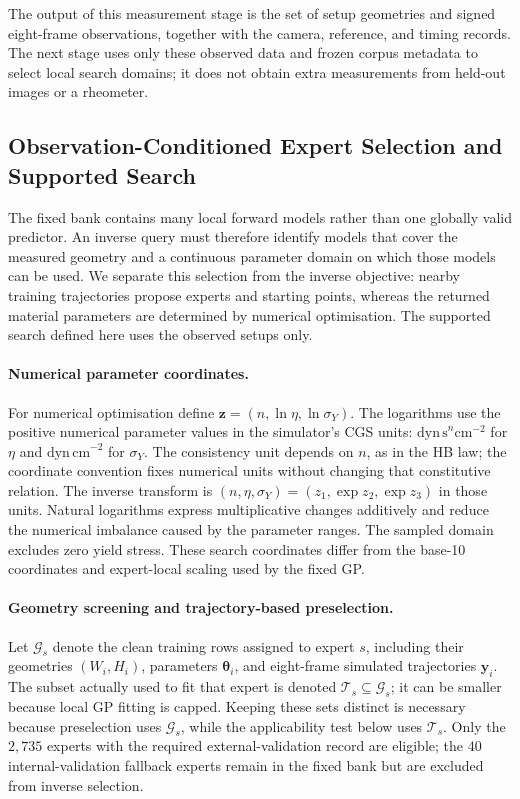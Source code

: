 The output of this measurement stage is the set of setup geometries
and signed eight-frame observations, together with the camera,
reference, and timing records. The next stage uses only these observed
data and frozen corpus metadata to select local search domains; it
does not obtain extra measurements from held-out images or a rheometer.

\FloatBarrier
\FloatBarrier
\subsection{Observation-Conditioned Expert Selection and Supported Search}
\label{sec:retrieval}

The fixed bank contains many local forward models rather than one globally
valid predictor. An inverse query must therefore identify models that cover
the measured geometry and a continuous parameter domain on which those models
can be used. We separate this selection from the inverse objective: nearby
training trajectories propose experts and starting points, whereas the
returned material parameters are determined by numerical optimisation.
The supported search defined here uses the observed setups only.

\paragraph{Numerical parameter coordinates.}
\label{sec:search-coordinates}
For numerical optimisation define
$\mathbf z=(n,\ln\eta,\ln\sigma_Y)$. The logarithms use the positive
numerical parameter values in the simulator's CGS units:
$\mathrm{dyn\,s}^{n}\mathrm{cm}^{-2}$ for $\eta$ and
$\mathrm{dyn\,cm}^{-2}$ for $\sigma_Y$. The consistency unit depends on
$n$, as in the HB law; the coordinate convention fixes numerical units
without changing that constitutive relation. The inverse transform is
$(n,\eta,\sigma_Y)=(z_1,\exp z_2,\exp z_3)$ in those units.
Natural logarithms express multiplicative changes additively and reduce
the numerical imbalance caused by the parameter ranges. The sampled
domain excludes zero yield stress. These search coordinates differ from
the base-10 coordinates and expert-local scaling used by the fixed GP.

\paragraph{Geometry screening and trajectory-based preselection.}
Let $\mathcal G_s$ denote the clean training rows assigned to expert $s$,
including their geometries $(W_i,H_i)$, parameters $\boldsymbol\theta_i$,
and eight-frame simulated trajectories $\mathbf y_i$.
The subset actually used to fit that expert is denoted
$\mathcal T_s\subseteq\mathcal G_s$; it can be smaller because local GP
fitting is capped. Keeping these sets distinct is necessary because
preselection uses $\mathcal G_s$, while the applicability test below uses
$\mathcal T_s$.
Only the $2{,}735$ experts with the required external-validation record
are eligible; the $40$ internal-validation fallback experts remain in
the fixed bank but are excluded from inverse selection.

